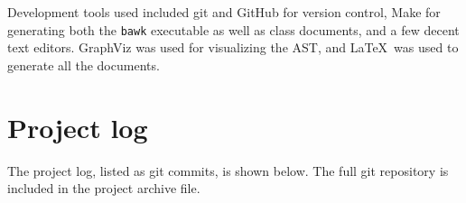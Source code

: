 Development tools used included git and GitHub for version control, Make for generating both the \texttt{bawk} executable as well as class documents, and a few decent text editors.  GraphViz was used for visualizing the AST, and \LaTeX\ was used to generate all the documents.

\section{Project log}
The project log, listed as git commits, is shown below.  The full git repository is included in the project archive file.
